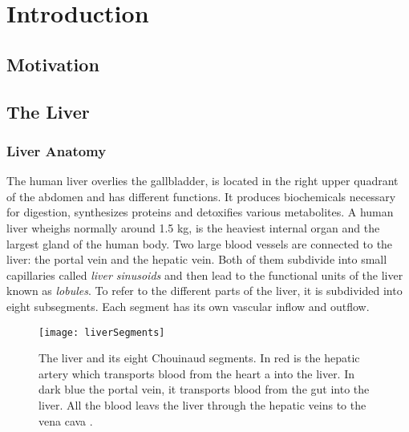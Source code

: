 %
%
%

\chapter{Introduction}
\section{Motivation} 





\section{The Liver} 
\subsection{Liver Anatomy}
The human liver overlies the gallbladder, is located in the right upper quadrant of the abdomen and has
different functions. It produces biochemicals necessary for digestion,
synthesizes proteins and detoxifies various metabolites. A human liver wheighs
normally around 1.5 kg, is the heaviest internal organ and the largest gland
of the human body. Two large blood vessels are connected to the liver: the
portal vein and the hepatic vein. Both of them subdivide into small
capillaries called \textit{liver sinusoids} and then lead to the functional
units of the liver known as \textit{lobules}. To refer to the different parts of
the liver, it is subdivided into eight subsegments. Each segment has its own
vascular inflow and outflow.
\begin{figure}[H]
  \centering
 \texttt{[image: liverSegments]}
  \caption{The liver and its eight Chouinaud segments. In red is the hepatic
    artery which transports blood from the heart a into the liver. In dark blue
    the portal vein, it transports blood from the gut into the liver. All the
    blood leavs the liver through the hepatic veins to the vena cava \cite{siriwardena2014management}.}
  \label{fig:liverSegments}
\end{figure}

